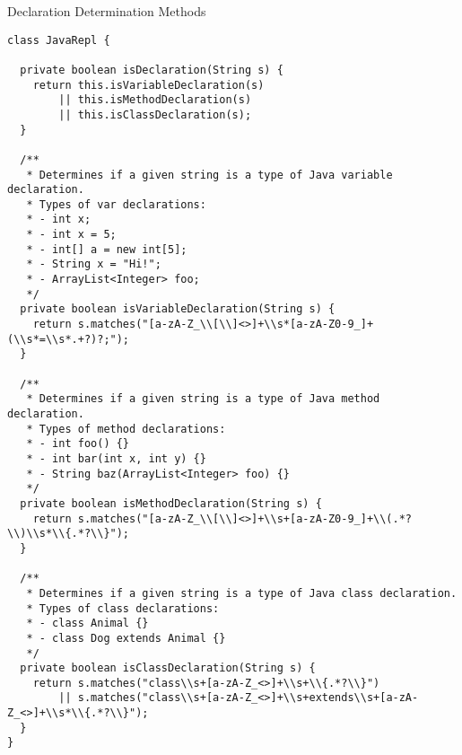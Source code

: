 \begin{cl}{Declaration Determination Methods}
\begin{lstlisting}[language=MyJava]
class JavaRepl {

  private boolean isDeclaration(String s) {
    return this.isVariableDeclaration(s)
        || this.isMethodDeclaration(s)
        || this.isClassDeclaration(s);
  }

  /**
   * Determines if a given string is a type of Java variable declaration.
   * Types of var declarations:
   * - int x;
   * - int x = 5;
   * - int[] a = new int[5];
   * - String x = "Hi!";
   * - ArrayList<Integer> foo;
   */
  private boolean isVariableDeclaration(String s) {
    return s.matches("[a-zA-Z_\\[\\]<>]+\\s*[a-zA-Z0-9_]+(\\s*=\\s*.+?)?;");
  }

  /**
   * Determines if a given string is a type of Java method declaration.
   * Types of method declarations:
   * - int foo() {}
   * - int bar(int x, int y) {}
   * - String baz(ArrayList<Integer> foo) {}
   */
  private boolean isMethodDeclaration(String s) {
    return s.matches("[a-zA-Z_\\[\\]<>]+\\s+[a-zA-Z0-9_]+\\(.*?\\)\\s*\\{.*?\\}");
  }

  /**
   * Determines if a given string is a type of Java class declaration.
   * Types of class declarations:
   * - class Animal {}
   * - class Dog extends Animal {}
   */
  private boolean isClassDeclaration(String s) {
    return s.matches("class\\s+[a-zA-Z_<>]+\\s+\\{.*?\\}") 
        || s.matches("class\\s+[a-zA-Z_<>]+\\s+extends\\s+[a-zA-Z_<>]+\\s*\\{.*?\\}");
  }
}
\end{lstlisting}
\end{cl}

